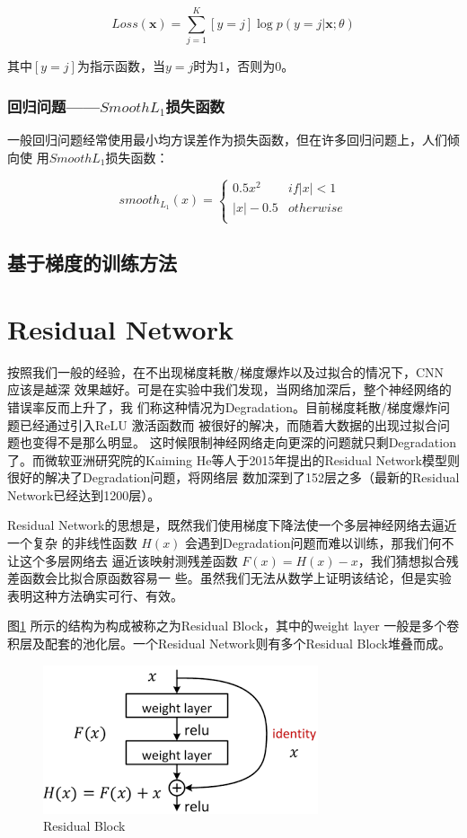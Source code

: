 \[
Loss(\mathbf{x}) = \sum_{j=1}^{K}[y = j]\log{p(y=j|\mathbf{x};\theta)}
\]

其中$[y = j]$为指示函数，当$y = j$时为1，否则为0。

\subsubsection{回归问题——$Smooth L_1$损失函数}

一般回归问题经常使用最小均方误差作为损失函数，但在许多回归问题上，人们倾向使
用$Smooth L_1$损失函数：

\[
smooth_{L_1}(x) = 
\begin{cases}
0.5x^2 & if |x| < 1 \\
|x| - 0.5 & otherwise \\
\end{cases}
\]

\subsection{基于梯度的训练方法}

\section{Residual Network}

按照我们一般的经验，在不出现梯度耗散/梯度爆炸以及过拟合的情况下，CNN 应该是越深
效果越好。可是在实验中我们发现，当网络加深后，整个神经网络的错误率反而上升了，我
们称这种情况为Degradation。目前梯度耗散/梯度爆炸问题已经通过引入ReLU 激活函数而
被很好的解决\cite{Nair:2010vq}，而随着大数据的出现过拟合问题也变得不是那么明显。
这时候限制神经网络走向更深的问题就只剩Degradation了。而微软亚洲研究院的Kaiming
He等人于2015年提出的Residual Network模型则很好的解决了Degradation问题，将网络层
数加深到了152层之多（最新的Residual Network已经达到1200层）。

Residual Network的思想是，既然我们使用梯度下降法使一个多层神经网络去逼近一个复杂
的非线性函数 $H(x)$ 会遇到Degradation问题而难以训练，那我们何不让这个多层网络去
逼近该映射测残差函数 $F(x) = H(x) - x$，我们猜想拟合残差函数会比拟合原函数容易一
些。虽然我们无法从数学上证明该结论，但是实验表明这种方法确实可行、有效。

图\ref{Fig:ResBlock} 所示的结构为构成被称之为Residual Block，其中的weight layer
一般是多个卷积层及配套的池化层。一个Residual Network则有多个Residual Block堆叠而成。

\begin{figure}
  \centering
  \includegraphics[width=0.8\linewidth]{./Figure/ResBlock.png}
  \caption{Residual Block\cite{He:2015tt}}\label{Fig:ResBlock}
\end{figure}

